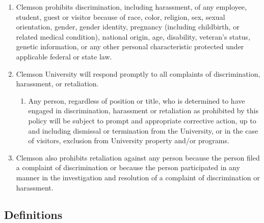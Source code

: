 \begin{enumerate}

	\item Clemson prohibits discrimination, including harassment, of any employee, student, guest or visitor because of race, color, religion, sex, sexual orientation, gender, gender identity, pregnancy (including childbirth, or related medical condition), national origin, age, disability, veteran’s status, genetic information, or any other personal characteristic protected under applicable federal or state law.

	\item Clemson University will respond promptly to all complaints of discrimination, harassment, or retaliation.

	\begin{enumerate}

		\item Any person, regardless of position or title, who is determined to have engaged in discrimination, harassment or retaliation as prohibited by this policy will be subject to prompt and appropriate corrective action, up to and including dismissal or termination from the University, or in the case of visitors, exclusion from University property and/or programs.

	\end{enumerate}

	\item Clemson also prohibits retaliation against any person because the person filed a complaint of discrimination or because the person participated in any manner in the investigation and resolution of a complaint of discrimination or harassment.

\end{enumerate}

\subsection*{Definitions}

